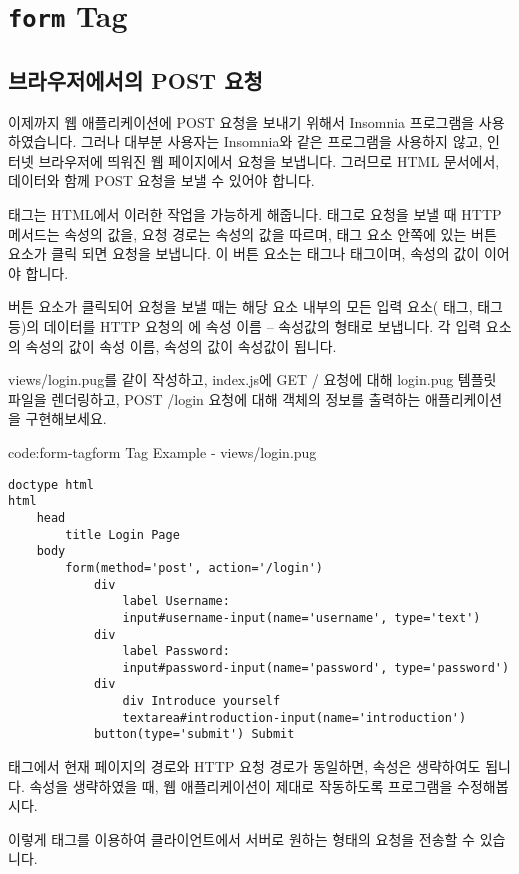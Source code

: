 \section{\texttt{form} Tag}\label{sect:form-tag}

\subsection*{브라우저에서의 POST 요청}

이제까지 웹 애플리케이션에 POST 요청을 보내기 위해서 Insomnia 프로그램을 사용하였습니다. 그러나 대부분 사용자는 Insomnia와 같은 프로그램을 사용하지 않고, 인터넷 브라우저에 띄워진 웹 페이지에서 요청을 보냅니다. 그러므로 HTML 문서에서,  데이터와 함께 POST 요청을 보낼 수 있어야 합니다.

 태그는 HTML에서 이러한 작업을 가능하게 해줍니다.  태그로 요청을 보낼 때 HTTP 메서드는  속성의 값을, 요청 경로는  속성의 값을 따르며,  태그 요소 안쪽에 있는 버튼 요소가 클릭 되면 요청을 보냅니다. 이 버튼 요소는  태그나  태그이며,  속성의 값이 이어야 합니다.

버튼 요소가 클릭되어 요청을 보낼 때는 해당  요소 내부의 모든 입력 요소( 태그,  태그 등)의 데이터를 HTTP 요청의 에 속성 이름 – 속성값의 형태로 보냅니다. 각 입력 요소의  속성의 값이 속성 이름,  속성의 값이 속성값이 됩니다.

views/login.pug를 \와 같이 작성하고, index.js에 GET / 요청에 대해 login.pug 템플릿 파일을 렌더링하고, POST /login 요청에 대해  객체의 정보를 출력하는 애플리케이션을 구현해보세요.

\begin{codeenv}{code:form-tag}{form Tag Example - views/login.pug}\begin{verbatim}
doctype html
html
    head
        title Login Page
    body
        form(method='post', action='/login')
            div
                label Username:
                input#username-input(name='username', type='text')
            div
                label Password:
                input#password-input(name='password', type='password')
            div
                div Introduce yourself
                textarea#introduction-input(name='introduction')
            button(type='submit') Submit
\end{verbatim}
\end{codeenv}

 태그에서 현재 페이지의 경로와 HTTP 요청 경로가 동일하면,  속성은 생략하여도 됩니다.  속성을 생략하였을 때, 웹 애플리케이션이 제대로 작동하도록 프로그램을 수정해봅시다.

이렇게  태그를 이용하여 클라이언트에서 서버로 원하는 형태의 요청을 전송할 수 있습니다.
